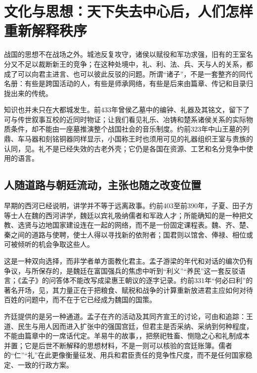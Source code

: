 \section{文化与思想：天下失去中心后，人们怎样重新解释秩序}

战国的思想不在战场之外。城池反复攻守，诸侯以赋役和军功求强，旧有的王室名分又不足以裁断新王的竞争；在这种处境中，礼、利、法、兵、天与人的关系，都成了可以向君主进言、也可以彼此反驳的问题。所谓“诸子”，不是一套整齐的同代名册：有些是跨国活动的人，有些是师承网络，有些是后来由篇章、传记和目录归拢出来的传统。

知识也并未只在大都城发生。前433年曾侯乙墓中的编钟、礼器及其铭文，留下了可与传世叙事互校的近同时物证；让我们看见礼乐、冶铸和楚系诸侯关系的实际物质条件，却不能由一座墓推演整个战国社会的音乐制度。约前323年中山王墓的列鼎、车马器和刻铭铜器同样显示，小国称王时也须用可见的礼器组织王室与贵族的认同，见。礼不是已经失效的古老外壳；它仍是各国在资源、工艺和名分竞争中使用的语言。

\subsection{人随道路与朝廷流动，主张也随之改变位置}

早期的西河已经说明，讲学并不等于远离政事。约前403至前390年，子夏、田子方等士人在魏的西河讲学，魏廷以宾礼吸纳儒者和军政人才；所能确知的是一种把文教、选贤与边地国家建设连在一起的网络，而不是一份固定课程表。魏、齐、楚、秦之间的道路与使聘，使士人得以寻找新的依附者；国君则以馆舍、俸禄、相位或可被倾听的机会争取这些人。

这是一种双向选择，而非学者单方面教化君主。孟子游梁的年代和对话的编次仍有争议，与所保存的，是魏廷在富国强兵的焦虑中听到“利义”“养民”这一套反驳语言；《孟子》的问答体不能改写成梁惠王朝议的逐字记录。约前331年“何必曰利”的著名开场，见，其力量正在于把粮食、赋税和战争的计算重新放进君主应如何对待百姓的问题中，而不在于它已经成为魏国的国策。

齐廷提供的是另一种通道。孟子在齐的活动及其同齐宣王的讨论，可由和追踪：王道、民生与用人因而进入扩张中的强国宫廷，但君主是否采纳、采纳到何种程度，不能由篇章中的一席话代定。羊易牛的故事，，把祭祀牲畜、恻隐之心和礼制成本并置；它是后世不断解释的思想材料，不是一则可以核验的宫廷账簿。儒者的“仁”“礼”在此更像衡量征发、用兵和君臣责任的竞争性尺度，而不是任何国家稳定、一致的行政方案。

